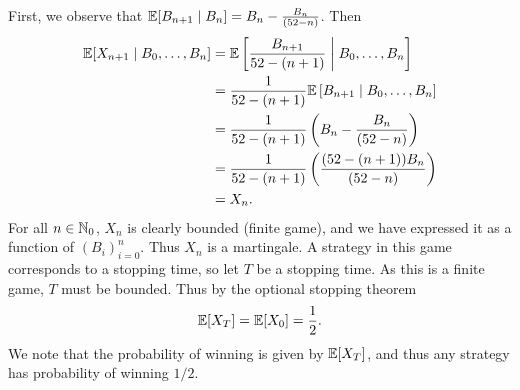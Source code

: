 \begin{solution}
    First, we observe that $\mathbb E[B_{n+1} \mid B_n] = B_n - \frac{B_n}{(52 - n)}$. Then
    \begin{align*}
        \mathbb E[X_{n+1} \mid B_0, \ldots, B_n] & = \mathbb E\left[\frac{B_{n+1}}{52-(n+1)} \;\middle|\; B_0, \ldots, B_n\right] \\
                                          & = \frac{1}{52-(n+1)} \mathbb E\left[B_{n+1} \;\middle|\; B_0, \ldots, B_n\right] \\
                                          & = \frac{1}{52-(n+1)} \left(B_n - \frac{B_n}{(52 - n)}\right) \\
                                          & = \frac{1}{52-(n+1)} \left(\frac{(52 - (n+1))B_n}{(52 - n)}\right) \\
                                          &= X_n.
    \end{align*}
    For all $n \in \mathbb N_0$, $X_n$ is clearly bounded (finite game), and we have expressed it as a function of $(B_i)_{i=0}^n$. Thus $X_n$ is a martingale. A strategy in this game corresponds to a stopping time, so let $T$ be a stopping time. As this is a finite game, $T$ must be bounded. Thus by the optional stopping theorem
    \[ \mathbb E[X_T] = \mathbb E[X_0] = \frac12. \]
    We note that the probability of winning is given by $\mathbb E[X_T]$, and thus any strategy has probability of winning $1/2$.
\end{solution}